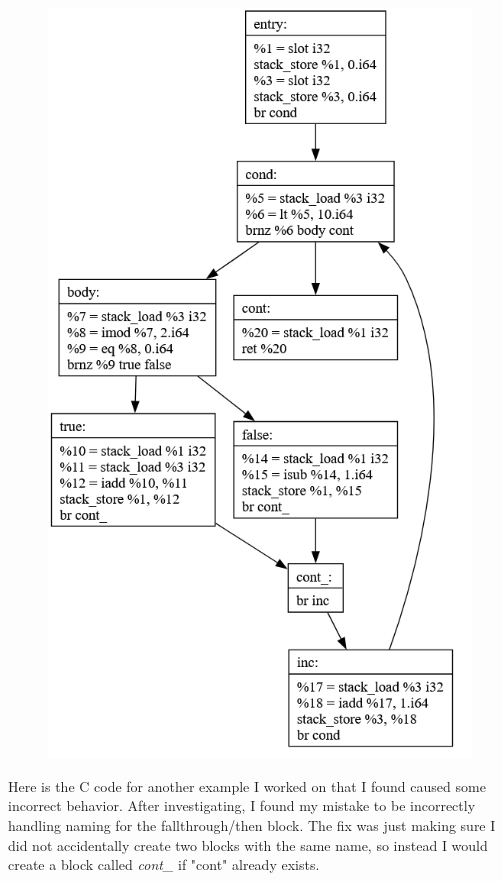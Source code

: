 \documentclass[11pt, a4paper, titlepage]{article}
\begin{document}
\begin{figure}[H]
  \centering
  \includegraphics[scale=0.4]{images/i14.png}
\end{figure}

Here is the C code for another example I worked on that I found caused some incorrect behavior.
After investigating, I found my mistake to be incorrectly handling naming for the fallthrough/then block.
The fix was just making sure I did not accidentally create two blocks with the same name,
so instead I would create a block called \textit{cont\_} if "cont" already exists. 
\end{document}
